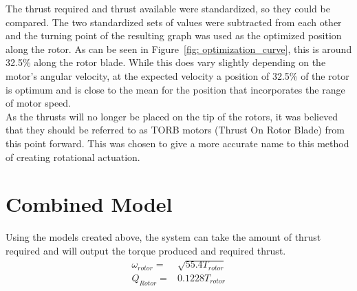         The thrust required and thrust available were standardized, so they could be compared. The two standardized sets of values were subtracted from each other and the turning point of the resulting graph was used as the optimized position along the rotor. As can be seen in Figure~\ref{fig: optimization_curve}, this is around 32.5\% along the rotor blade. While this does vary slightly depending on the motor's angular velocity, at the expected velocity a position of 32.5\%  of the rotor is optimum and is close to the mean for the position that incorporates the range of motor speed.\\
  
        As the thrusts will no longer be placed on the tip of the rotors, it was believed that they should be referred to as TORB motors (Thrust On Rotor Blade) from this point forward. This was chosen to give a more accurate name to this method of creating rotational actuation.
    \section{Combined Model}
        Using the models created above, the system can take the amount of thrust required and will output the torque produced and required thrust. 
        \begin{align}
            \omega_{rotor} =& \sqrt{55.4T_{rotor}}\\
            Q_{Rotor} =& 0.1228T_{rotor}
        \end{align}


